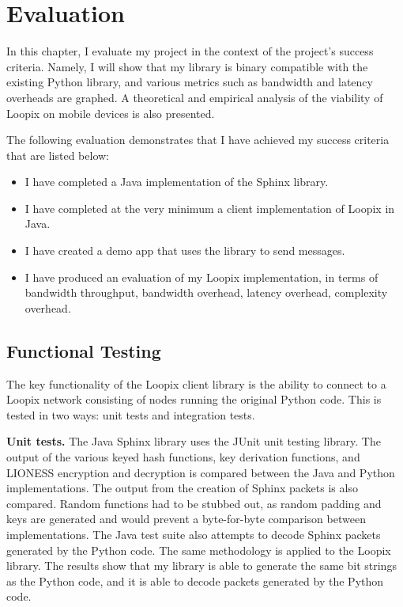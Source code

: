 \documentclass[final,dissertation.tex]{subfiles}
\begin{document}
\chapter{Evaluation} \label{chapter:evaluation}

In this chapter, I evaluate my project in the context of the project's success criteria. Namely, I will show that my library is binary compatible with the existing Python library, and various metrics such as bandwidth and latency overheads are graphed. A theoretical and empirical analysis of the viability of Loopix on mobile devices is also presented.

The following evaluation demonstrates that I have achieved my success criteria that are listed below:

\begin{itemize}
	\item I have completed a Java implementation of the Sphinx library.
	\item I have completed at the very minimum a client implementation of Loopix in Java.
	\item I have created a demo app that uses the library to send messages.
	\item I have produced an evaluation of my Loopix implementation, in terms of bandwidth throughput, bandwidth overhead, latency overhead, complexity overhead.
\end{itemize}

\section{Functional Testing}

The key functionality of the Loopix client library is the ability to connect to a Loopix network consisting of nodes running the original Python code. This is tested in two ways: unit tests and integration tests.

\textbf{Unit tests.} The Java Sphinx library uses the JUnit unit testing library. The output of the various keyed hash functions, key derivation functions, and LIONESS encryption and decryption is compared between the Java and Python implementations. The output from the creation of Sphinx packets is also compared. Random functions had to be stubbed out, as random padding and keys are generated and would prevent a byte-for-byte comparison between implementations. The Java test suite also attempts to decode Sphinx packets generated by the Python code. The same methodology is applied to the Loopix library. The results show that my library is able to generate the same bit strings as the Python code, and it is able to decode packets generated by the Python code.
\end{document}
